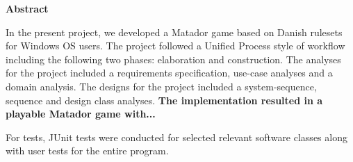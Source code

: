 \begin{flushleft} %

\begin{center}
    \vspace{0.9cm}
    \textbf{Abstract}
\end{center}
\doublespacing

In the present project, we developed a Matador game based on Danish rulesets for Windows OS users. The project followed a Unified Process style of workflow including the following two phases: elaboration and construction. The analyses for the project included a requirements specification, use-case analyses and a domain analysis. The designs for the project included a system-sequence, sequence and design class analyses. \textbf{The implementation resulted in a playable Matador game with...}

For tests, JUnit tests were conducted for selected relevant software classes along with user tests for the entire program.



\end{flushleft}
